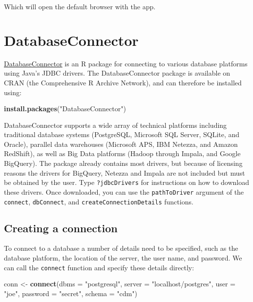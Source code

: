 \documentclass[11pt]{book}
\newenvironment{Shaded}{\begin{snugshade}}{\end{snugshade}}
\newcommand{\KeywordTok}[1]{\textcolor[rgb]{0.13,0.29,0.53}{\textbf{#1}}}
\newcommand{\DataTypeTok}[1]{\textcolor[rgb]{0.13,0.29,0.53}{#1}}
\newcommand{\StringTok}[1]{\textcolor[rgb]{0.31,0.60,0.02}{#1}}
\newcommand{\NormalTok}[1]{#1}
\begin{document}
Which will open the default browser with the app.

\section{DatabaseConnector}\label{DatabaseConnector}

\href{https://ohdsi.github.io/DatabaseConnector/}{DatabaseConnector} is
an R package for connecting to various database platforms using Java's
JDBC drivers. The DatabaseConnector package is available on CRAN (the
Comprehensive R Archive Network), and can therefore be installed using:

\begin{Shaded}
\begin{Highlighting}[]
\KeywordTok{install.packages}\NormalTok{(}\StringTok{"DatabaseConnector"}\NormalTok{)}
\end{Highlighting}
\end{Shaded}

DatabaseConnector supports a wide array of technical platforms including
traditional database systems (PostgreSQL, Microsoft SQL Server, SQLite,
and Oracle), parallel data warehouses (Microsoft APS, IBM Netezza, and
Amazon RedShift), as well as Big Data platforms (Hadoop through Impala,
and Google BigQuery). The package already contains most drivers, but
because of licensing reasons the drivers for BigQuery, Netezza and
Impala are not included but must be obtained by the user. Type
\texttt{?jdbcDrivers} for instructions on how to download these drivers.
Once downloaded, you can use the \texttt{pathToDriver} argument of the
\texttt{connect}, \texttt{dbConnect}, and
\texttt{createConnectionDetails} functions.

\subsection{Creating a connection}\label{creating-a-connection}

To connect to a database a number of details need to be specified, such
as the database platform, the location of the server, the user name, and
password. We can call the \texttt{connect} function and specify these
details directly:

\begin{Shaded}
\begin{Highlighting}[]
\NormalTok{conn <-}\StringTok{ }\KeywordTok{connect}\NormalTok{(}\DataTypeTok{dbms =} \StringTok{"postgresql"}\NormalTok{,}
                \DataTypeTok{server =} \StringTok{"localhost/postgres"}\NormalTok{,}
                \DataTypeTok{user =} \StringTok{"joe"}\NormalTok{,}
                \DataTypeTok{password =} \StringTok{"secret"}\NormalTok{,}
                \DataTypeTok{schema =} \StringTok{"cdm"}\NormalTok{)}
\end{Highlighting}
\end{Shaded}
\end{document}
